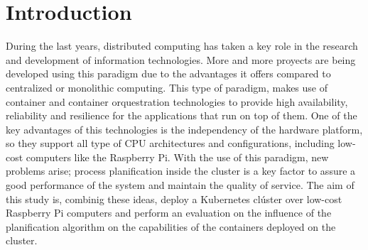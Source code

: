 \documentclass[conference]{IEEEtran}
\begin{document}
\section{Introduction}
During the last years, distributed computing has taken a key role in the research and development of information technologies.
More and more proyects are being developed using this paradigm due to the advantages it offers compared to centralized or monolithic computing.
This type of paradigm, makes use of container and container orquestration technologies to provide high availability, reliability and resilience
for the applications that run on top of them. One of the key advantages of this technologies is the independency of the hardware platform, so they
support all type of CPU architectures and configurations, including low-cost computers like the Raspberry Pi. With the use of this paradigm,
new problems arise; process planification inside the cluster is a key factor to assure a good performance of the system and maintain the quality
of service. The aim of this study is, combinig these ideas, deploy a Kubernetes clúster over low-cost Raspberry Pi computers and perform an evaluation
on the influence of the planification algorithm on the capabilities of the containers deployed on the cluster.
\end{document}
